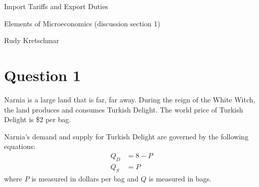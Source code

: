 \documentclass[12pt]{article}
\begin{document}
\begin{center}
\Large Import Tariffs and Export Duties

\medskip

\normalsize Elements of Microeconomics (discussion section 1)

\medskip

\small Rudy Kretschmar
\end{center}

\section*{Question 1}
Narnia is a large land that is far, far away. During the reign of the White Witch, 
the land produces and consumes Turkish Delight. The world price of Turkish Delight 
is \$2 per bag.

Narnia's demand and supply for Turkish Delight are governed by the following equations:
\begin{align*}
    Q_D &= 8 - P \\
    Q_S &= P
\end{align*}
where $P$ is measured in dollars per bag and $Q$ is measured in bags.
\end{document}
